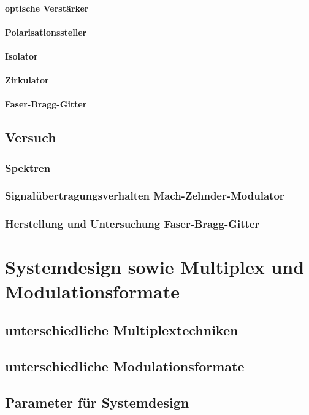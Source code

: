 \documentclass[a4paper]{article}
\begin{document}
\paragraph{optische Verstärker}
\paragraph{Polarisationssteller}
\paragraph{Isolator}
\paragraph{Zirkulator}
\paragraph{Faser-Bragg-Gitter}

\subsection{Versuch}
\subsubsection{Spektren}
\subsubsection{Signalübertragungsverhalten Mach-Zehnder-Modulator}
\subsubsection{Herstellung und Untersuchung Faser-Bragg-Gitter}


\newpage
\section{Systemdesign sowie Multiplex und Modulationsformate}
\subsection{unterschiedliche Multiplextechniken}
\subsection{unterschiedliche Modulationsformate}
\subsection{Parameter für Systemdesign}
\end{document}
